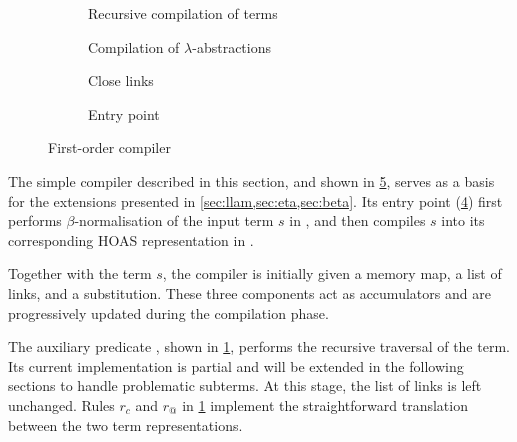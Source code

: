 \begin{figure}

  \begin{subfigure}{1\textwidth}    
    \vspace{-15pt}
    \caption{Recursive compilation of terms}
    \label{fig:comp-fo}
  \end{subfigure}

  \vspace{.5em}

  \begin{subfigure}{1\textwidth}    
    \vspace{-15pt}
    \caption{Compilation of $\lambda$-abstractions}
    \label{fig:comp-mlam}
  \end{subfigure}

  \vspace{.5em}

  \begin{subfigure}{1\textwidth}    
    \vspace{-15pt}
    \caption{Close links}
    \label{fig:close-links}
  \end{subfigure}

  \vspace{.5em}

  \begin{subfigure}{1\textwidth}    
    \vspace{-15pt}
    \caption{Entry point}
    \label{fig:comp-entry-point}
  \end{subfigure}
  \caption{First-order compiler}
  \label{fig:comp-fo-all}
\end{figure}

The simple compiler described in this section, and shown in
\cref{fig:comp-fo-all}, serves as a basis for the extensions presented in
\cref{sec:llam,sec:eta,sec:beta}. Its entry point
(\ref{fig:comp-entry-point}) first performs $\beta$-normalisation of the
input term $s$ in \Fo, and then compiles $s$ into its corresponding HOAS
representation in \Ho.

Together with the term $s$, the compiler is initially given a memory
map, a list of links, and a substitution. These three components act as
accumulators and are progressively updated during the compilation phase.

The auxiliary predicate , shown in \cref{fig:comp-fo}, performs
the recursive traversal of the \Fo term. Its current implementation is
partial and will be extended in the following sections to handle
problematic subterms. At this stage, the list of links is left
unchanged. Rules $r_c$ and $r_@$ in \cref{fig:comp-fo} implement the
straightforward translation between the two term representations.

